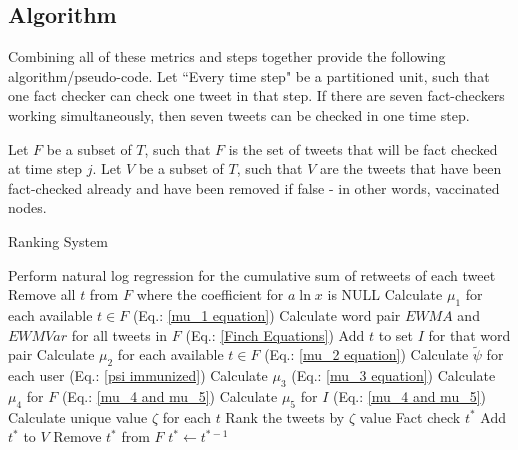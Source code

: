 \documentclass[preprint,review,12pt]{elsarticle}
\begin{document}
\subsection{Algorithm}
Combining all of these metrics and steps together provide the following algorithm/pseudo-code. Let ``Every time step" be a partitioned unit, such that one fact checker can check one tweet in that step. If there are seven fact-checkers working simultaneously, then seven tweets can be checked in one time step.

Let $F$ be a subset of $T$, such that $F$ is the set of tweets that will be fact checked at time step $j$. Let $V$ be a subset of $T$, such that $V$ are the tweets that have been fact-checked already and have been removed if false - in other words, vaccinated nodes.

\begin{algorithm}
\label{Ranking System Algorithm}
	\caption{Ranking System}
	\begin{algorithmic}[1]
		\State Perform natural log regression for the cumulative sum of retweets of each tweet
		\State Remove all $t$ from $F$ where the coefficient for $a\ln x$ is NULL
		\State Calculate $\mu_1$ for each available $t \in F$
		(Eq.: \ref{mu_1 equation})
		\State Calculate word pair $EWMA$ and $EWMVar$ for all tweets in $F$ (Eq.: \ref{Finch Equations})
		\State Add $t$ to set $I$ for that word pair
		\EndIf
		\State Calculate $\mu_2$ for each available $t \in F$ (Eq.: \ref{mu_2 equation})
		\State Calculate $\tilde{\psi}$ for each user (Eq.: \ref{psi immunized})
		\State Calculate $\mu_3$ (Eq.: \ref{mu_3 equation})
		\State Calculate $\mu_4$ for $F$ (Eq.: \ref{mu_4 and mu_5})
		\State Calculate $\mu_5$ for $I$ (Eq.: \ref{mu_4 and mu_5})
		\EndIf
		\State Calculate unique value $\zeta$ for each $t$ 
		\State Rank the tweets by $\zeta$ value
		\State Fact check $t^*$ 
		\State Add $t^*$ to $V$
		\State Remove $t^*$ from $F$
		\State $t^* \xleftarrow[]{} t^{*-1}$
		\EndFor
		\EndWhile
		\EndFor
	\end{algorithmic} 
\end{algorithm} 
\newpage
\end{document}
